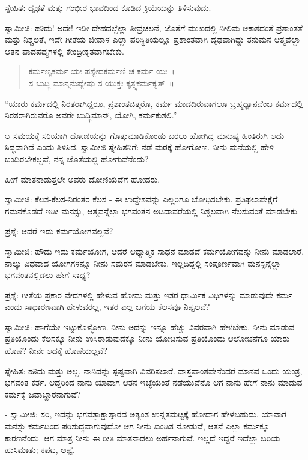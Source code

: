 ಸ್ನೇಹಿತ: ದೃಢತೆ ಮತ್ತು ಗಂಭೀರ ಭಾವದಿಂದ ಕೂಡಿದ ಕ್ರಿಯೆಯನ್ನು ತಿಳಿಸುವುದು.

ಸ್ವಾಮೀಜಿ: ಹೌದು! ಅದೇ! ಇಡೀ ದೇಹದಲ್ಲೆಲ್ಲಾ ತೀವ್ರಚಲನೆ, ಜೊತೆಗೆ ಮುಖದಲ್ಲಿ ನೀಲಿಮ ಆಕಾಶದಂತೆ ಪ್ರಶಾಂತತೆ ಮತ್ತು ನಿಶ್ಚಲತೆ, ಇದೇ ಗೀತೆಯ ಜೀವಾಳ ಎಲ್ಲಾ ಪರಿಸ್ಥಿತಿಯಲ್ಲೂ ಪ್ರಶಾಂತವಾಗಿ ದೃಢವಾಗಿದ್ದು ತನುಮನ ಆತ್ಮವೆಲ್ಲಾ ಆತನ ಪಾದಪದ್ಮಗಳಲ್ಲಿ ಕೇಂದ್ರೀಕೃತವಾಗಬೇಕು.

\begin{verse}
ಕರ್ಮಣ್ಯಕರ್ಮ ಯಃ ಪಶ್ಯೇದಕರ್ಮಣಿ ಚ ಕರ್ಮ ಯಃ~।\\ಸ ಬುದ್ಧಿ ಮಾನ್ಮನುಷ್ಯೇಷು ಸ ಯುಕ್ತಃ ಕೃತ್ಸ್ನಕರ್ಮಕೃತ್~॥
\end{verse}


“ಯಾರು ಕರ್ಮದಲ್ಲಿ ನಿರತರಾಗಿದ್ದರೂ, ಪ್ರಶಾಂತಚಿತ್ತರೊ, ಕರ್ಮ ಮಾಡದಿರುವಾಗಲೂ ಬ್ರಹ್ಮಧ್ಯಾನವೆಂಬ ಕರ್ಮದಲ್ಲಿ ನಿರತರಾಗಿರುವರೊ ಅವರೇ ಬುದ್ಧಿಮಾನ್, ಯೋಗಿ, ಕರ್ಮಕುಶಲಿ.”

ಆ ಸಮಯಕ್ಕೆ ಸರಿಯಾಗಿ ದೋಣಿಯನ್ನು ಗೊತ್ತುಮಾಡಿಕೊಂಡು ಬರಲು ಹೋಗಿದ್ದ ಮನುಷ್ಯ ಹಿಂತಿರುಗಿ ಅದು ಸಿದ್ಧವಾಗಿದೆ ಎಂದು ತಿಳಿಸಿದ. ಸ್ವಾಮೀಜಿ ಸ್ನೇಹಿತನಿಗೆ: ನಡೆ ಮಠಕ್ಕೆ ಹೋಗೋಣ. ನೀನು ಮನೆಯಲ್ಲಿ ಹೇಳಿ ಬಂದಿರಬೇಕಲ್ಲವೆ, ನನ್ನ ಜೊತೆಯಲ್ಲಿ ಹೋಗುವೆನೆಂದು?

ಹೀಗೆ ಮಾತನಾಡುತ್ತಲೇ ಅವರು ದೋಣಿಯೆಡೆಗೆ ಹೋದರು.

ಸ್ವಾಮೀಜಿ: ಕೆಲಸ-ಕೆಲಸ-ನಿರಂತರ ಕೆಲಸ - ಈ ಉದ್ದೇಶವನ್ನು ಎಲ್ಲರಿಗೂ ಬೋಧಿಸಬೇಕು. ಪ್ರತಿಫಲಾಪೇಕ್ಷೆಗೆ ಗಮನಕೊಡದೆ ಇಡೀ ಮನಸ್ಸು, ಆತ್ಮವನ್ನೆಲ್ಲಾ ಭಗವಂತನ ಅಡಿದಾವರೆಯಲ್ಲಿ ನಿಶ್ಚಲವಾಗಿ ನೆಲಸುವಂತೆ ಮಾಡಬೇಕು.

ಪ್ರಶ್ನೆ: ಆದರೆ ಇದು ಕರ್ಮಯೋಗವಲ್ಲವೆ?

ಸ್ವಾಮೀಜಿ: ಹೌದು ಇದು ಕರ್ಮಯೋಗ, ಆದರೆ ಆಧ್ಯಾತ್ಮಿಕ ಸಾಧನೆ ಮಾಡದೆ ಕರ್ಮಯೋಗವನ್ನು ನೀನು ಮಾಡಲಾರೆ. ನಾಲ್ಕು ವಿಧವಾದ ಯೋಗಗಳನ್ನೂ ನೀನು ಸಮರಸ ಮಾಡಬೇಕು. ಇಲ್ಲದಿದ್ದಲ್ಲಿ ಸಂಪೂರ್ಣವಾಗಿ ಮನಸ್ಸನ್ನೆಲ್ಲಾ ಭಗವಂತನಲ್ಲಿಡಲು ಹೇಗೆ ಸಾಧ್ಯ?

ಪ್ರಶ್ನೆ: ಗೀತೆಯ ಪ್ರಕಾರ ವೇದಗಳಲ್ಲಿ ಹೇಳುವ ಹೋಮ ಮತ್ತು ಇತರ ಧಾರ್ಮಿಕ ವಿಧಿಗಳನ್ನು ಮಾಡುವುದೇ ಕರ್ಮ ಎಂದು ಸಾಧಾರಣವಾಗಿ ಹೇಳುವರಲ್ಲ, ಇತರ ಎಲ್ಲ ಬಗೆಯ ಕೆಲಸವೂ ನಿಷ್ಪಲವೆ?

ಸ್ವಾಮೀಜಿ: ಹಾಗೆಯೇ ಇಟ್ಟುಕೊಳ್ಳೋಣ. ನೀನು ಅದನ್ನು ಇನ್ನೂ ಹೆಚ್ಚು ವಿವರವಾಗಿ ಹೇಳಬೇಕು. ನೀನು ಮಾಡುವ ಪ್ರತಿಯೊಂದು ಕೆಲಸಕ್ಕೂ ನೀನು ಉಸಿರಾಡುವುದಕ್ಕೂ ನೀನು ಯೋಚಿಸುವ ಪ್ರತಿಯೊಂದು ಆಲೋಚನೆಗೂ ಯಾರು ಹೊಣೆ? ನೀನೇ ಅದಕ್ಕೆ ಹೊಣೆಯಲ್ಲವೆ?

ಸ್ನೇಹಿತ: ಹೌದು ಮತ್ತು ಅಲ್ಲ. ನಾನಿದನ್ನು ಸ್ಪಷ್ಟವಾಗಿ ವಿವರಿಸಲಾರೆ. ವಾಸ್ತವಾಂಶವೇನೆಂದರೆ ಮಾನವ ಒಂದು ಯಂತ್ರ, ಭಗವಂತ ಕರ್ತ. ಆದ್ದರಿಂದ ನಾನು ಯಾವಾಗ ಆತನ ಇಚ್ಛೆಯಂತೆ ನಡೆಯುವೆನೊ ಆಗ ನಾನು ಹೇಗೆ ನಾನು ಮಾಡುವ ಕರ್ಮಕ್ಕೆ ಜವಾಬ್ದಾರನಾಗುವೆ?

- ಸ್ವಾಮೀಜಿ: ಸರಿ, ಇದನ್ನು ಭಗವತ್ಸಾಕ್ಷಾತ್ಕಾರದ ಅತ್ಯಂತ ಉನ್ನತಮಟ್ಟಕ್ಕೆ ಹೋದಾಗ ಹೇಳಬಹುದು. ಯಾವಾಗ ಮನಸ್ಸು ಕರ್ಮದಿಂದ ಪರಿಶುದ್ಧವಾಗುವುದೋ ಆಗ ನೀನು ಖಂಡಿತ ನೋಡುವೆ, ಆತನೆ ಎಲ್ಲಾ ಕರ್ಮಕ್ಕೂ ಕಾರಣನೆಂದು. ಆಗ ಮಾತ್ರ ನೀನು ಈ ರೀತಿ ಮಾತನಾಡಲು ಅರ್ಹನಾಗುವೆ. ಇಲ್ಲದೆ ಇದ್ದರೆ ಇದೆಲ್ಲಾ ಬರಿಯ ಹುಸಿಮಾತು; ಕಪಟ, ಅಷ್ಟೆ.

